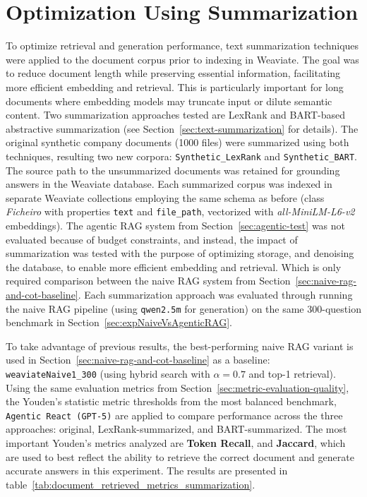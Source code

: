 \section{Optimization Using Summarization}
To optimize retrieval and generation performance, text summarization techniques were applied to the document corpus prior to indexing in Weaviate. The goal was to reduce document length while preserving essential information, facilitating more efficient embedding and retrieval.
This is particularly important for long documents where embedding models may truncate input or dilute semantic content.
Two summarization approaches tested are LexRank and BART-based abstractive summarization (see Section~\ref{sec:text-summarization} for details).
The original synthetic company documents (1000 files) were summarized using both techniques, resulting two new corpora: \texttt{Synthetic\_LexRank} and \texttt{Synthetic\_BART}. The source path to the unsummarized documents was retained for grounding answers in the Weaviate database.
Each summarized corpus was indexed in separate Weaviate collections employing the same schema as before (class \textit{Ficheiro} with properties \texttt{text} and \texttt{file\_path}, vectorized with \textit{all-MiniLM-L6-v2} embeddings). The agentic RAG system from Section~\ref{sec:agentic-test} was not evaluated because of budget constraints, and instead, the impact of summarization was tested with the purpose of optimizing storage, and denoising the database, to enable more efficient embedding and retrieval. Which is only required comparison between the naive RAG system from Section~\ref{sec:naive-rag-and-cot-baseline}.
Each summarization approach was evaluated through running the naive RAG pipeline (using \texttt{qwen2.5m} for generation) on the same 300-question benchmark in Section~\ref{sec:expNaiveVsAgenticRAG}.

To take advantage of previous results, the best-performing naive RAG variant is used in Section~\ref{sec:naive-rag-and-cot-baseline} as a baseline: \texttt{weaviateNaive1\_300} (using hybrid search with \(\alpha=0.7\) and top-1 retrieval). Using the same evaluation metrics from Section~\ref{sec:metric-evaluation-quality}, the Youden's statistic metric thresholds from the most balanced benchmark, \texttt{Agentic React (\gls{GPT}-5)} are applied to compare performance across the three approaches: original, LexRank-summarized, and BART-summarized. The most important Youden's metrics analyzed are \textbf{Token Recall}, and \textbf{Jaccard}, which are used to best reflect the ability to retrieve the correct document and generate accurate answers in this experiment.
The results are presented in table~\ref{tab:document_retrieved_metrics_summarization}.

